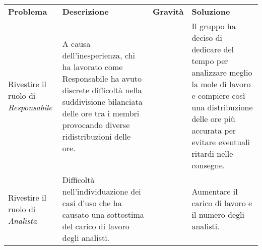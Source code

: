 \begin{table}[H]
    \caption{Tabella delle problematiche relative ai ruoli}	
\renewcommand{\arraystretch}{1.5}
\begin{longtable}{  >{\centering}p{} >{}p{}
    >{\centering}p{} >{}p{}}
    \rowcolor{\primaryColor}
    \textcolor{\secondaryColor}{
    \centering\textbf{Problema}}     & \textcolor{\secondaryColor}{\centering\textbf{Descrizione}}    & \textcolor{\secondaryColor}
    {\centering\textbf{Gravità}} & \textcolor{\secondaryColor}{\centering\textbf{Soluzione}}\\
   
    Rivestire il ruolo di \textit{Responsabile}  
    &  A causa dell'inesperienza, chi ha lavorato come Responsabile ha avuto discrete difficoltà nella suddivisione bilanciata delle ore tra i membri provocando diverse ridistribuzioni delle ore.
    & 2  
    & Il gruppo ha deciso di dedicare del tempo per analizzare meglio la mole di lavoro e compiere così una distribuzione delle ore più accurata per evitare eventuali ritardi nelle consegne. {} \\
    Rivestire il ruolo di \textit{Analista}
    & Difficoltà nell'individuazione dei casi d'uso che ha causato una sottostima del carico di lavoro degli analisti.
    & 3
    & Aumentare il carico di lavoro e il numero degli analisti. \\
    \end{longtable}
\end{table}
